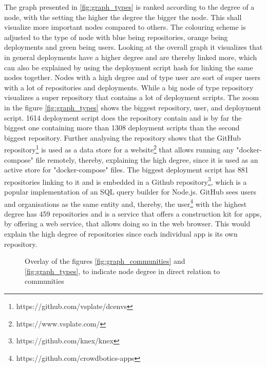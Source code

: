 The graph presented in \ref{fig:graph_types} is ranked according to the degree of a node, with the setting the higher the degree the bigger the node. This shall visualize more important nodes compared to others. The colouring scheme is adjusted to the type of node with blue being repositories, orange being deployments and green being users. Looking at the overall graph it visualizes that in general deployments have a higher degree and are thereby linked more, which can also be explained by using the deployment script hash for linking the same nodes together. Nodes with a high degree and of type user are sort of super users with a lot of repositories and deployments. While a big node of type repository visualizes a super repository that contains a lot of deployment scripts.
The zoom in the figure \ref{fig:graph_types} shows the biggest repository, user, and deployment script.
1614 deployment script does the repository contain and is by far the biggest one containing more than 1308 deployment scripts than the second biggest repository. Further analysing the repository shows that the GitHub repository\footnote{https://github.com/vsplate/dcenvs} is used as a data store for a website\footnote{https://www.vsplate.com/} that allows running any "docker-compose" file remotely, thereby, explaining the high degree, since it is used as an active store for "docker-compose" files.
The biggest deployment script has 881 repositories linking to it and is embedded in a Github repository\footnote{https://github.com/knex/knex}, which is a popular implementation of an SQL query builder for Node.js.
GitHub sees users and organisations as the same entity and, thereby, the user\footnote{https://github.com/crowdbotics-apps} with the highest degree has 459 repositories and is a service that offers a construction kit for apps, by offering a web service, that allows doing so in the web browser. This would explain the high degree of repositories since each individual app is its own repository.

\begin{figure}[H]\centering
{}
    \caption{Overlay of the figures \ref{fig:graph_communities} and \ref{fig:graph_types}, to indicate node degree in direct relation to communities}
    \label{fig:graph_merged}
\end{figure}

